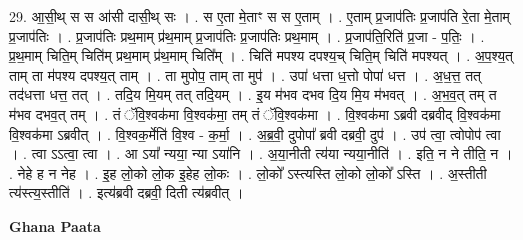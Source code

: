 \documentclass[17pt]{extarticle}
\begin{document}
29. आ॒सी॒थ् स स आ॑सी दासी॒थ् सः । . स ए॒ता मे॒ताꣳ स स ए॒ताम् । . ए॒ताम् प्र॒जाप॑तिः प्र॒जाप॑ति रे॒ता मे॒ताम् प्र॒जाप॑तिः । . प्र॒जाप॑तिः प्रथ॒माम् प्र॑थ॒माम् प्र॒जाप॑तिः प्र॒जाप॑तिः प्रथ॒माम् । . प्र॒जाप॑ति॒रिति॑ प्र॒जा - प॒तिः॒ । . प्र॒थ॒माम् चिति॒म् चिति॑म् प्रथ॒माम् प्र॑थ॒माम् चिति᳚म् । . चिति॑ मपश्य दपश्य॒च् चिति॒म् चिति॑ मपश्यत् । . अ॒प॒श्य॒त् ताम् ता म॑पश्य दपश्य॒त् ताम् । . ता मुपोप॒ ताम् ता मुप॑ । . उपा॑ धत्ता ध॒त्तो पोपा॑ धत्त । . अ॒ध॒त्त॒ तत् तद॑धत्ता धत्त॒ तत् । . तदि॒य मि॒यम् तत् तदि॒यम् । . इ॒य म॑भव दभव दि॒य मि॒य म॑भवत् । . अ॒भ॒व॒त् तम् त म॑भव दभव॒त् तम् । . तं ॅवि॒श्वक॑मा वि॒श्वक॑मा॒ तम् तं ॅवि॒श्वक॑मा । . वि॒श्वक॑मा ऽब्रवी दब्रवीद् वि॒श्वक॑मा वि॒श्वक॑मा ऽब्रवीत् । . वि॒श्वक॒र्मेति॑ वि॒श्व - क॒र्मा॒ । . अ॒ब्र॒वी॒ दुपोपा᳚ ब्रवी दब्रवी॒ दुप॑ । . उप॑ त्वा॒ त्वोपोप॑ त्वा । . त्वा ऽऽत्वा॒ त्वा । . आ ऽया᳚ न्यया॒ न्या ऽया॑नि । . अ॒या॒नीती त्य॑या न्यया॒नीति॑ । . इति॒ न ने तीति॒ न । . नेहे ह न नेह । . इ॒ह लो॒को लो॒क इ॒हेह लो॒कः । . लो॒को᳚ ऽस्त्यस्ति लो॒को लो॒को᳚ ऽस्ति । . अ॒स्तीती त्य॑स्त्य॒स्तीति॑ । . इत्य॑ब्रवी दब्रवी॒ दिती त्य॑ब्रवीत् । \newline

\textbf{Ghana Paata } \newline
\end{document}
